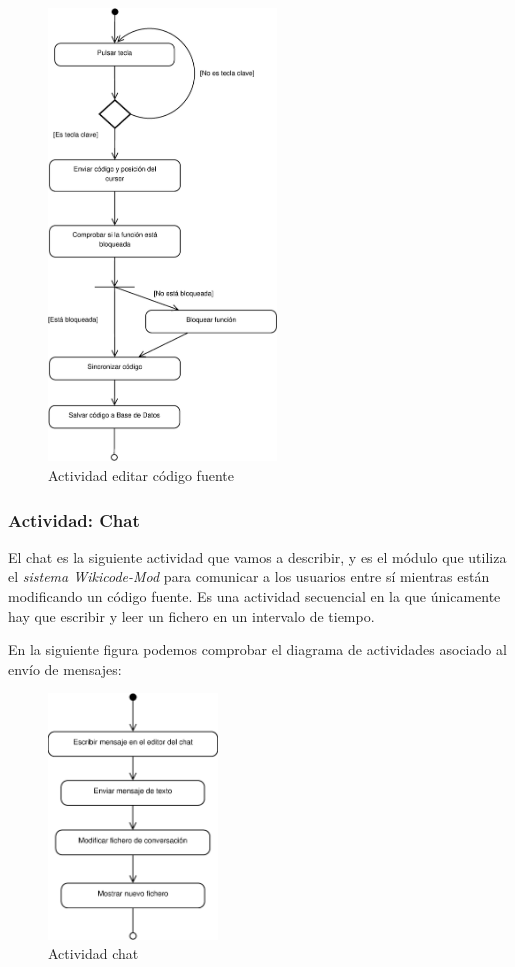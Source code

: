 \begin{figure}[h]
	\centering
	\includegraphics[width=0.54\textwidth]{./img/DiagramaA3.eps}
	\caption{Actividad editar código fuente}
\end{figure}

\newpage

\subsubsection{Actividad: Chat}

El chat es la siguiente actividad que vamos a describir, y es el módulo que utiliza el \emph{sistema Wikicode-Mod} para comunicar a los usuarios entre sí mientras están modificando un código fuente. Es una actividad secuencial en la que únicamente hay que escribir y leer un fichero en un intervalo de tiempo.

En la siguiente figura podemos comprobar el diagrama de actividades asociado al envío de mensajes:

\begin{figure}[h]
	\centering
	\includegraphics[width=0.4\textwidth]{./img/DiagramaA4.eps}
	\caption{Actividad chat}
\end{figure}

